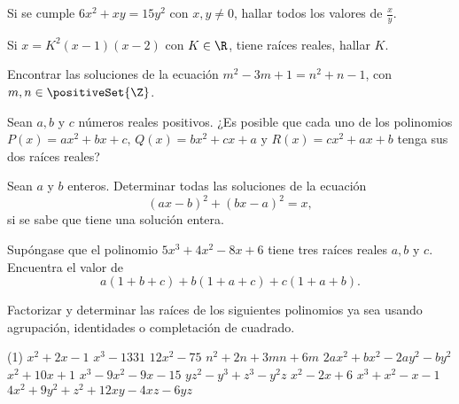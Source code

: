 \begin{multicols}{2}
    \begin{exercise}
        Si se cumple $6x^2 + xy = 15y^2$ con $x, y \neq 0$, hallar todos los valores de $\frac{x}{y}$.
    \end{exercise}

    \begin{exercise}
        Si $x = K^2(x - 1)(x - 2)$ con $K \in \R$, tiene raíces reales, hallar $K$.
    \end{exercise}

    \begin{exercise}
        Encontrar las soluciones de la ecuación $m^2 - 3m + 1 = n^2 + n - 1$, con $m, n \in \positiveSet{\Z}$.
    \end{exercise}

    \begin{problem}
        Sean $a, b$ y $c$ números reales positivos.
        ¿Es posible que cada uno de los polinomios $P(x) = ax^2 + bx + c \mbox{, } Q(x) = bx^2 + cx + a \mbox{ y } R(x) = cx^2 + ax + b$ tenga sus dos raíces reales?
    \end{problem}

    \begin{problem}
        Sean $a$ y $b$ enteros.
        Determinar todas las soluciones de la ecuación
        \[(ax - b)^2 + (bx - a)^2 =  x,\] si se sabe que tiene una solución entera.
    \end{problem}

    \begin{problem}
        Supóngase que el polinomio $5x^3 + 4x^2 - 8x + 6$ tiene tres raíces reales $a, b \mbox{ y } c$.
        Encuentra el valor de
        \[a(1 + b + c) + b(1 + a + c) + c(1 + a + b).\]
    \end{problem}

    \begin{exercise}
        Factorizar y determinar las raíces de los siguientes polinomios ya sea usando agrupación, identidades o completación de cuadrado.
        \begin{tasks}[label=\Alph*)](1)
        \task $x^2 + 2x - 1$
        \task $x^3 - 1331$
        \task $12x^2 - 75$
        \task $n^2 + 2n + 3mn + 6m$
        \task $2ax^2 + bx^2 - 2ay^2 - by^2$
        \task $x^2 + 10x + 1$
        \task $x^3 - 9x^2 - 9x - 15$
        \task $yz^2 - y^3 + z^3 - y^2 z$
        \task $x^2 - 2x + 6$
        \task $x^3 + x^2 - x - 1$
            \task $4x^2 + 9y^2 + z^2 + 12xy - 4xz - 6yz$
        \end{tasks}
    \end{exercise}


\end{multicols}
